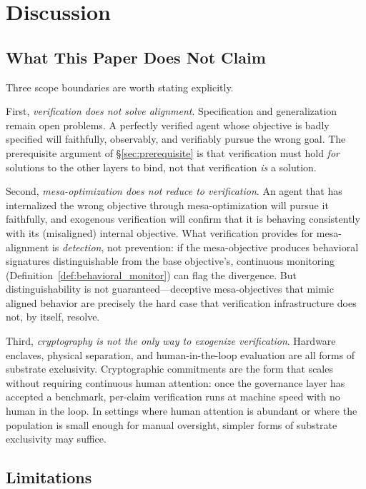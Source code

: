 \section{Discussion}
\label{sec:discussion}

\subsection{What This Paper Does Not Claim}

Three scope boundaries are worth stating explicitly.

First, \emph{verification does not solve alignment}.  Specification
and generalization remain open problems.  A perfectly verified agent
whose objective is badly specified will faithfully, observably, and
verifiably pursue the wrong goal.  The prerequisite argument of
\S\ref{sec:prerequisite} is that verification must hold \emph{for}
solutions to the other layers to bind, not that verification
\emph{is} a solution.

Second, \emph{mesa-optimization does not reduce to verification}.
An agent that has internalized the wrong objective through
mesa-optimization will pursue it faithfully, and exogenous
verification will confirm that it is behaving consistently with its
(misaligned) internal objective.  What verification provides for
mesa-alignment is \emph{detection}, not prevention: if the
mesa-objective produces behavioral signatures distinguishable from
the base objective's, continuous monitoring
(Definition~\ref{def:behavioral_monitor}) can flag the divergence.
But distinguishability is not guaranteed---deceptive mesa-objectives
that mimic aligned behavior are precisely the hard case that
verification infrastructure does not, by itself, resolve.

Third, \emph{cryptography is not the only way to exogenize
verification}.  Hardware enclaves, physical separation, and
human-in-the-loop evaluation are all forms of substrate exclusivity.
Cryptographic commitments are the form that scales without requiring
continuous human attention: once the governance layer has accepted a
benchmark, per-claim verification runs at machine speed with no human
in the loop.  In settings where human attention is abundant or where
the population is small enough for manual oversight, simpler forms of
substrate exclusivity may suffice.

\subsection{Limitations}


